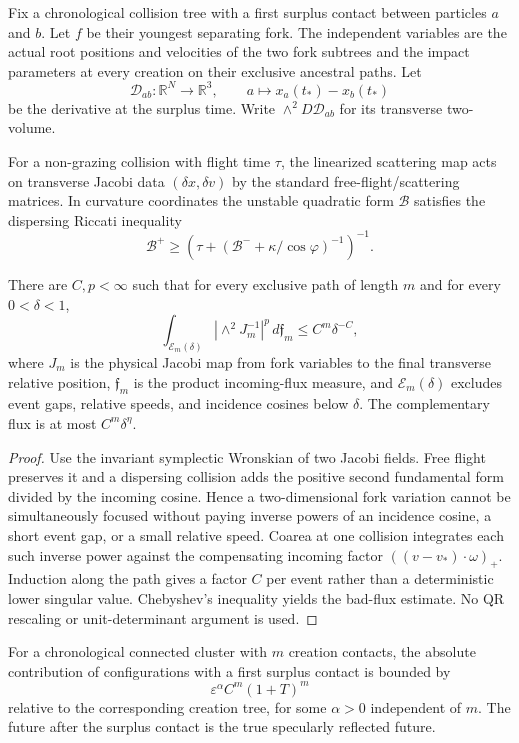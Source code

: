 Fix a chronological collision tree with a first surplus contact between
particles $a$ and $b$.  Let $f$ be their youngest separating fork.  The
independent variables are the actual root positions and velocities of the two
fork subtrees and the impact parameters at every creation on their exclusive
ancestral paths.  Let
\[
 \mathcal D_{ab}:\mathbb R^N\longrightarrow\mathbb R^3,
 \qquad a\mapsto x_a(t_*)-x_b(t_*)
\]
be the derivative at the surplus time.  Write
$\wedge^2D\mathcal D_{ab}$ for its transverse two-volume.

For a non-grazing collision with flight time $\tau$, the linearized scattering
map acts on transverse Jacobi data $(\delta x,\delta v)$ by the standard
free-flight/scattering matrices.  In curvature coordinates the unstable
quadratic form $\mathcal B$ satisfies the dispersing Riccati inequality
\[
 \mathcal B^+\ge
 \left(\tau+(\mathcal B^-+\kappa/\cos\varphi)^{-1}\right)^{-1}.
\]

\begin{lemma}
\label{lem:r9-b2-jacobi}
There are $C,p<\infty$ such that for every exclusive path of length $m$ and
for every $0<\delta<1$,
\[
 \int_{\mathcal E_m(\delta)}
 \left|\wedge^2J_m^{-1}\right|^p
 \,d\mathfrak f_m
 \le C^m\delta^{-C},
\]
where $J_m$ is the physical Jacobi map from fork variables to the final
transverse relative position, $\mathfrak f_m$ is the product incoming-flux
measure, and $\mathcal E_m(\delta)$ excludes event gaps, relative speeds, and
incidence cosines below $\delta$.  The complementary flux is at most
$C^m\delta^\eta$.
\end{lemma}

\begin{proof}
Use the invariant symplectic Wronskian of two Jacobi fields.  Free flight
preserves it and a dispersing collision adds the positive second fundamental
form divided by the incoming cosine.  Hence a two-dimensional fork variation
cannot be simultaneously focused without paying inverse powers of an
incidence cosine, a short event gap, or a small relative speed.  Coarea at one
collision integrates each such inverse power against the compensating
incoming factor $((v-v_*)\cdot\omega)_+$.  Induction along the path gives a
factor $C$ per event rather than a deterministic lower singular value.
Chebyshev's inequality yields the bad-flux estimate.  No QR rescaling or
unit-determinant argument is used.
\end{proof}

\begin{theorem}
\label{thm:r9-b2-surplus}
For a chronological connected cluster with $m$ creation contacts, the
absolute contribution of configurations with a first surplus contact is
bounded by
\[
 \varepsilon^{\alpha}C^m(1+T)^m
\]
relative to the corresponding creation tree, for some $\alpha>0$ independent
of $m$.  The future after the surplus contact is the true specularly reflected
future.
\end{theorem}

